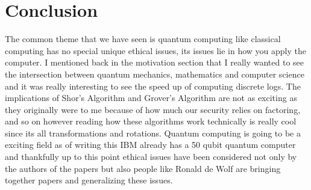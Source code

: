\documentclass{article}
\begin{document}
\section{Conclusion}
The common theme that we have seen is quantum computing like classical computing has no special unique ethical issues, its issues lie in how you apply the computer. I mentioned back in the motivation section that I really wanted to see the intersection between quantum mechanics, mathematics and computer science and it was really interesting to see the speed up of computing discrete logs. The implications of Shor's Algorithm and Grover's Algorithm are not as exciting as they originally were to me because of how much our security relies on factoring, and so on however reading how these algorithms work technically is really cool since its all transformations and rotations. Quantum computing is going to be a exciting field as of writing this IBM already has a 50 qubit quantum computer and thankfully up to this point ethical issues have been considered not only by the authors of the papers but also people like Ronald de Wolf are bringing together papers and generalizing these issues.





\cleardoublepage


\nocite{*}
\end{document}
